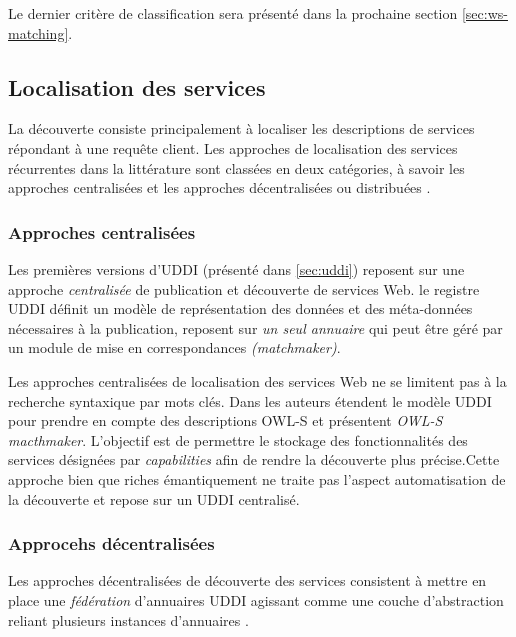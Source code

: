 Le dernier critère de classification sera présenté dans la prochaine
section \ref{sec:ws-matching}.

\subsection{Localisation des services}
\label{sec:ws-localisation}
  La découverte consiste principalement à localiser les descriptions
  de services répondant à une requête client. Les approches de
  localisation des services récurrentes dans la littérature sont
  classées en deux catégories, à savoir les approches centralisées et
  les approches décentralisées ou distribuées
  \cite{garofalakis2004web}.

    \subsubsection{Approches centralisées}
    \label{sec:central-disc}
    Les premières versions d'\textsc{UDDI} \cite{clement2004uddi}
    (présenté dans \ref{sec:uddi}) reposent sur une approche
    \textit{centralisée} de publication et découverte de services
    Web. le registre \textsc{UDDI} définit un modèle de représentation
    des données et des méta-données nécessaires à la publication,
    reposent sur \textit{un seul annuaire} qui peut être géré par un
    module de mise en correspondances \textit{(matchmaker)}.

    Les approches centralisées de localisation des services Web ne se
    limitent pas à la recherche syntaxique par mots clés. Dans
    \cite{srinivasan2004adding} les auteurs étendent le modèle
    \textsc{UDDI} pour prendre en compte des descriptions
    \textsc{OWL-S} et présentent \textit{OWL-S macthmaker}. L'objectif
    est de permettre le stockage des fonctionnalités des services
    désignées par \textit{capabilities} afin de rendre la découverte
    plus précise.Cette approche bien que riches émantiquement ne
    traite pas l'aspect automatisation de la découverte et repose sur
    un \textsc{UDDI} centralisé.

    \subsubsection{Approcehs décentralisées}
    \label{sec:decentr-disc}
    Les approches décentralisées de découverte des services consistent
    à mettre en place une \textit{fédération} d'annuaires
    \textsc{UDDI} agissant comme une couche d'abstraction reliant
    plusieurs instances d'annuaires \cite {rompothong2003query,
      sivashanmugam2004discovery}.

